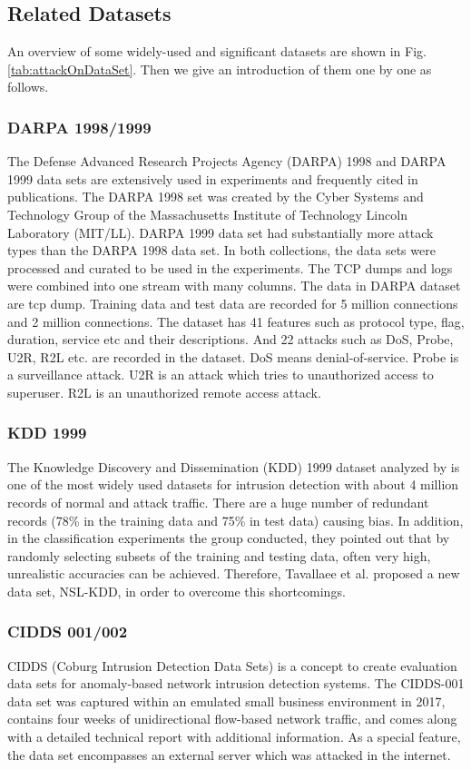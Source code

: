 \documentclass[conference]{IEEEtran}
\begin{document}
\subsection{Related Datasets}
An overview of some widely-used and significant datasets are shown in Fig. \ref{tab:attackOnDataSet}. Then we give an introduction of them one by one as follows. 

\subsubsection{DARPA 1998/1999}
The Defense Advanced Research Projects Agency (DARPA) 1998 \cite{lippmann2000evaluating} and DARPA 1999 data sets \cite{lippmann20001999} are extensively used in experiments and frequently cited in publications. The DARPA 1998 set was created by the Cyber Systems and Technology Group of the Massachusetts Institute of Technology Lincoln Laboratory (MIT/LL). DARPA 1999 data set had substantially more attack types than the DARPA 1998 data set. In both collections, the data sets were processed and curated to be used in the experiments. The TCP dumps and logs were combined into one stream with many columns. The data in DARPA dataset are tcp dump. Training data and test data are recorded for 5 million connections and 2 million connections. The dataset has 41 features such as protocol type, flag, duration, service etc and their descriptions. And 22 attacks such as DoS, Probe, U2R, R2L etc. are recorded in the dataset. DoS means denial-of-service. Probe is a surveillance attack. U2R is an attack which tries to unauthorized access to superuser. R2L is an unauthorized remote access attack.

\subsubsection{KDD 1999}
The Knowledge Discovery and Dissemination (KDD) 1999 dataset analyzed by \cite{tavallaee2009detailed} is one of the most widely used datasets for intrusion detection with about 4 million records of normal and attack traffic. There are a huge number of redundant records (78\% in the training data and 75\% in test data) causing bias. In addition, in the classification experiments the group conducted, they pointed out that by randomly selecting subsets of the training and testing data, often very high, unrealistic accuracies can be achieved. Therefore, Tavallaee et al. proposed a new data set, NSL-KDD, in order to overcome this shortcomings.

\subsubsection{CIDDS 001/002}
CIDDS (Coburg Intrusion Detection Data Sets) is a concept to create evaluation data sets for anomaly-based network intrusion detection systems. The CIDDS-001 data set was captured within an emulated small business environment in 2017, contains four weeks of unidirectional flow-based network traffic, and comes along with a detailed technical report with additional information. As a special feature, the data set encompasses an external server which was attacked in the internet. 
\end{document}
